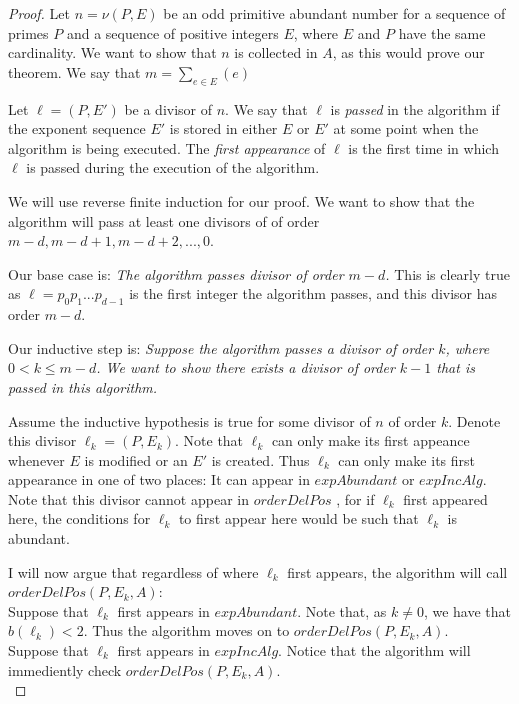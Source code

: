 \documentclass[../paper.tex]{subfiles}
\begin{document}
\begin{proof}
  Let $n = \nu (P, E)$ be an odd primitive abundant number for a
sequence of primes $P$ and a sequence of positive integers $E$,
where $E$ and $P$ have the same cardinality. We want to show that
$n$ is collected in $A$, as this would prove our theorem.
We say that $m = \sum_{e \in E}(e)$

  Let $\ell = (P, E')$ be a divisor of $n$. We say that $\ell$ is
\textit{passed} in the algorithm if the exponent sequence $E'$ is
stored in either $E$ or $E'$ at some point when the algorithm is
being executed. The \textit{first appearance} of $\ell$ is the
first time in which $\ell$ is passed during the execution of the
algorithm.

  We will use reverse finite induction for our proof. We want to show that
the algorithm will pass at least one divisors of of order $m -
d, m - d + 1, m - d + 2, ..., 0$.

Our base case is: \textit{The algorithm passes divisor of order $m
- d$.} This is clearly true as $\ell = p_0 p_1 ... p_{d-1}$ is the 
first integer the algorithm passes, and this divisor has order 
$m-d$.

Our inductive step is:
\textit{Suppose the algorithm passes a divisor of order $k$,
where $0 < k \leq m - d $. We want to show there exists a divisor
of order $k - 1$ that is passed in this algorithm.}


Assume the inductive hypothesis is true for some divisor of $n$ of
order $k$. Denote this divisor $\ell_k = (P, E_k)$. Note that
$\ell_k$ can only make its first appeance whenever $E$ is modified
or an $E'$ is created. Thus $\ell_k$ can only make its first
appearance in one of two places: It can appear in $expAbundant$ or
$expIncAlg$. Note that this divisor cannot appear in $orderDelPos$
, for if $\ell_k$ first appeared here, the conditions for $\ell_k$ 
to first appear here would be such that $\ell_k$ is abundant.

  I will now argue that regardless of where $\ell_k$ first
appears, the algorithm will call $orderDelPos(P,E_k,A)$:
\\

Suppose that $\ell_k$ first appears in $expAbundant$. Note that, 
as $k \neq 0$, we have that $b(\ell_k) < 2$. Thus the algorithm 
moves on to $orderDelPos(P, E_k, A)$.
\\

Suppose that $\ell_k$ first appears in $expIncAlg$. Notice that
the algorithm will immediently check $orderDelPos(P, E_k, A)$.
\\


\end{proof}
\end{document}
